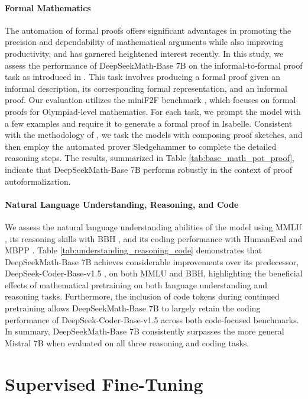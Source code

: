 \begin{itemize}[topsep=0pt]
\paragraph{Formal Mathematics}

The automation of formal proofs offers significant advantages in promoting the precision and dependability of mathematical arguments while also improving productivity, and has garnered heightened interest recently. In this study, we assess the performance of DeepSeekMath-Base 7B on the informal-to-formal proof task as introduced in \citep{dsp_proof}. This task involves producing a formal proof given an informal description, its corresponding formal representation, and an informal proof. Our evaluation utilizes the miniF2F benchmark \citep{minif2f}, which focuses on formal proofs for Olympiad-level mathematics. For each task, we prompt the model with a few examples and require it to generate a formal proof in Isabelle. Consistent with the methodology of \cite{dsp_proof}, we task the models with composing proof sketches, and then employ the automated prover Sledgehammer \citep{sledgehammer} to complete the detailed reasoning steps. The results, summarized in Table \ref{tab:base_math_pot_proof}, indicate that DeepSeekMath-Base 7B performs robustly in the context of proof autoformalization.

\paragraph{Natural Language Understanding, Reasoning, and Code}

We assess the natural language understanding abilities of the model using MMLU \citep{mmlu}, its reasoning skills with BBH \citep{bbh}, and its coding performance with HumanEval \citep{codex} and MBPP \citep{mbpp}. Table \ref{tab:understanding_reasoning_code} demonstrates that DeepSeekMath-Base 7B achieves considerable improvements over its predecessor, DeepSeek-Coder-Base-v1.5 \citep{deepseek-coder}, on both MMLU and BBH, highlighting the beneficial effects of mathematical pretraining on both language understanding and reasoning tasks. Furthermore, the inclusion of code tokens during continued pretraining allows DeepSeekMath-Base 7B to largely retain the coding performance of DeepSeek-Coder-Base-v1.5 across both code-focused benchmarks. In summary, DeepSeekMath-Base 7B consistently surpasses the more general Mistral 7B \citep{mistral} when evaluated on all three reasoning and coding tasks.

\section{Supervised Fine-Tuning}


\end{itemize}
